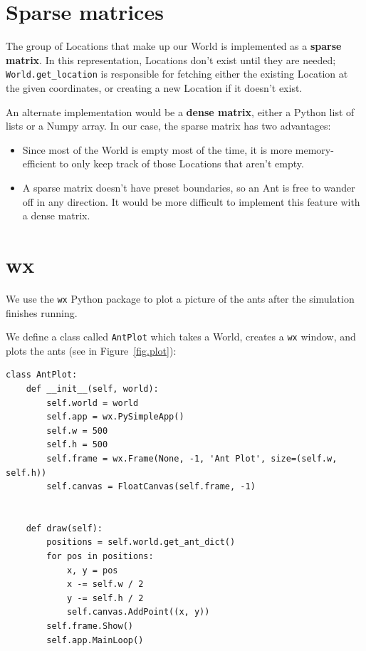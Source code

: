 \documentclass[10pt]{book}
\begin{document}
\section{Sparse matrices}

The group of Locations that make up our World is implemented as a
\textbf{sparse matrix}. In this representation, Locations don't exist
until they are needed; \texttt{World.get\_location} is
responsible for fetching either the existing Location at the given
coordinates, or creating a new Location if it doesn't exist.

An alternate implementation would be a \textbf{dense matrix},
either a Python list of lists or a Numpy array.
In our case, the sparse matrix has two advantages:

\begin{itemize}

\item Since most of the World is empty most of the time, it is more
  memory-efficient to only keep track of those Locations that aren't
  empty.

\item A sparse matrix doesn't have preset boundaries, so an Ant is free to
  wander off in any direction. It would be more difficult to implement
  this feature with a dense matrix.

\end{itemize}

\section{wx}

We use the \texttt{wx} Python package to plot a picture of the ants
after the simulation finishes running.

We define a class called \texttt{AntPlot} which
takes a World, creates a \texttt{wx} window, and plots
the ants (see in Figure~\ref{fig.plot}):

\begin{verbatim}
class AntPlot:
    def __init__(self, world):
        self.world = world
        self.app = wx.PySimpleApp()
        self.w = 500
        self.h = 500
        self.frame = wx.Frame(None, -1, 'Ant Plot', size=(self.w, self.h))
        self.canvas = FloatCanvas(self.frame, -1)
        
    
    def draw(self):
        positions = self.world.get_ant_dict()
        for pos in positions:
            x, y = pos
            x -= self.w / 2
            y -= self.h / 2
            self.canvas.AddPoint((x, y))
        self.frame.Show()
        self.app.MainLoop()
\end{verbatim}
\end{document}
